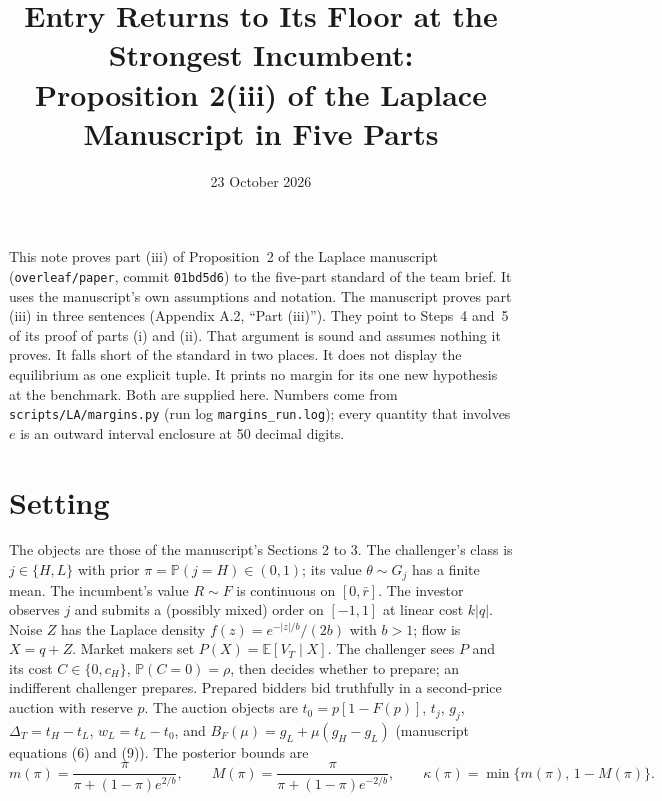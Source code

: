 \documentclass[12pt]{article}
\title{Entry Returns to Its Floor at the Strongest Incumbent:\\
Proposition 2(iii) of the Laplace Manuscript in Five Parts}
\author{}
\date{23 October 2026}
\theoremstyle{remark}
\newcommand{\E}{\mathbb E}
\renewcommand{\Pr}{\mathbb P}
\newcommand{\Dt}{\Delta_T}
\begin{document}
\maketitle

\noindent
This note proves part (iii) of Proposition~2 of the Laplace manuscript
(\texttt{overleaf/paper}, commit \texttt{01bd5d6}) to the five-part standard of the team brief.
It uses the manuscript's own assumptions and notation. The manuscript proves part (iii) in
three sentences (Appendix A.2, ``Part (iii)''). They point to Steps~4 and~5 of its proof of
parts (i) and (ii). That argument is sound and assumes nothing it proves. It falls short of the
standard in two places. It does not display the equilibrium as one explicit tuple. It prints no
margin for its one new hypothesis at the benchmark. Both are supplied here. Numbers come from
\texttt{scripts/LA/margins.py} (run log \texttt{margins\_run.log}); every quantity that
involves $e$ is an outward interval enclosure at 50 decimal digits.

\section*{Setting}

The objects are those of the manuscript's Sections 2 to 3. The challenger's class is
$j\in\{H,L\}$ with prior $\pi=\Pr(j=H)\in(0,1)$; its value $\theta\sim G_j$ has a finite mean.
The incumbent's value $R\sim F$ is continuous on $[0,\bar r]$. The investor observes $j$ and
submits a (possibly mixed) order on $[-1,1]$ at linear cost $k|q|$. Noise $Z$ has the Laplace
density $f(z)=e^{-|z|/b}/(2b)$ with $b>1$; flow is $X=q+Z$. Market makers set
$P(X)=\E[V_T\mid X]$. The challenger sees $P$ and its cost $C\in\{0,c_H\}$, $\Pr(C=0)=\rho$,
then decides whether to prepare; an indifferent challenger prepares. Prepared bidders bid
truthfully in a second-price auction with reserve $p$. The auction objects are
$t_0=p[1-F(p)]$, $t_j$, $g_j$, $\Dt=t_H-t_L$, $w_L=t_L-t_0$, and $B_F(\mu)=g_L+\mu(g_H-g_L)$
(manuscript equations (6) and (9)). The posterior bounds are
\[
m(\pi)=\frac{\pi}{\pi+(1-\pi)e^{2/b}},\qquad
M(\pi)=\frac{\pi}{\pi+(1-\pi)e^{-2/b}},\qquad
\kappa(\pi)=\min\{m(\pi),\,1-M(\pi)\}.
\]
\end{document}
